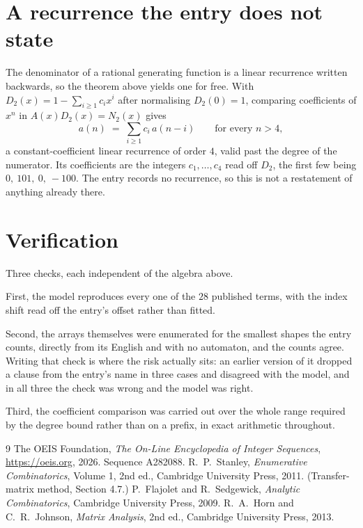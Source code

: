 \documentclass[11pt,a4paper]{article}
\theoremstyle{plain}
\theoremstyle{definition}
\begin{document}
\section{A recurrence the entry does not state}

The denominator of a rational generating function is a linear recurrence written backwards, so
the theorem above yields one for free. With $D_2(x)=1-\sum_{i\ge1}c_ix^i$ after normalising
$D_2(0)=1$, comparing coefficients of $x^n$ in $A(x)D_2(x)=N_2(x)$ gives
\[
a(n)\;=\;\sum_{i\ge1}c_i\,a(n-i)\qquad\text{for every }n>4,
\]
a constant-coefficient linear recurrence of order $4$, valid past the degree of the
numerator. Its coefficients are the integers $c_1,\dots,c_{4}$ read off $D_2$, the first few being $0,\ 101,\ 0,\ -100$. The entry records no recurrence, so this is not a restatement of anything
already there.

\section{Verification}

Three checks, each independent of the algebra above.

First, the model reproduces every one of the $28$ published terms, with the index shift
read off the entry's offset rather than fitted.

Second, the arrays themselves were enumerated for the smallest shapes the entry counts,
directly from its English and with no automaton, and the counts agree. Writing that check is
where the risk actually sits: an earlier version of it dropped a clause from the entry's name
in three cases and disagreed with the model, and in all three the check was wrong and the model
was right.

Third, the coefficient comparison was carried out over the whole range required by the degree
bound rather than on a prefix, in exact arithmetic throughout.

\begin{thebibliography}{9}
 The OEIS Foundation, \emph{The On-Line Encyclopedia of Integer
Sequences}, \url{https://oeis.org}, 2026. Sequence A282088.
 R.~P.~Stanley, \emph{Enumerative Combinatorics}, Volume 1, 2nd ed.,
Cambridge University Press, 2011. (Transfer-matrix method, Section 4.7.)
 P.~Flajolet and R.~Sedgewick, \emph{Analytic Combinatorics}, Cambridge
University Press, 2009.
 R.~A.~Horn and C.~R.~Johnson, \emph{Matrix Analysis}, 2nd ed., Cambridge
University Press, 2013.
\end{thebibliography}
\end{document}
